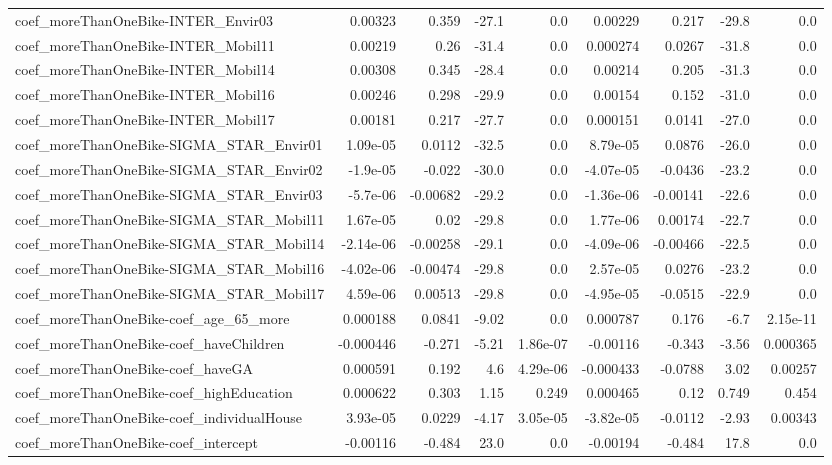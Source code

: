 \begin{tabular}{lrrrrrrrr}
coef_moreThanOneBike-INTER_Envir03 & 0.00323 & 0.359 & -27.1 & 0.0 & 0.00229 & 0.217 & -29.8 & 0.0 \\
coef_moreThanOneBike-INTER_Mobil11 & 0.00219 & 0.26 & -31.4 & 0.0 & 0.000274 & 0.0267 & -31.8 & 0.0 \\
coef_moreThanOneBike-INTER_Mobil14 & 0.00308 & 0.345 & -28.4 & 0.0 & 0.00214 & 0.205 & -31.3 & 0.0 \\
coef_moreThanOneBike-INTER_Mobil16 & 0.00246 & 0.298 & -29.9 & 0.0 & 0.00154 & 0.152 & -31.0 & 0.0 \\
coef_moreThanOneBike-INTER_Mobil17 & 0.00181 & 0.217 & -27.7 & 0.0 & 0.000151 & 0.0141 & -27.0 & 0.0 \\
coef_moreThanOneBike-SIGMA_STAR_Envir01 & 1.09e-05 & 0.0112 & -32.5 & 0.0 & 8.79e-05 & 0.0876 & -26.0 & 0.0 \\
coef_moreThanOneBike-SIGMA_STAR_Envir02 & -1.9e-05 & -0.022 & -30.0 & 0.0 & -4.07e-05 & -0.0436 & -23.2 & 0.0 \\
coef_moreThanOneBike-SIGMA_STAR_Envir03 & -5.7e-06 & -0.00682 & -29.2 & 0.0 & -1.36e-06 & -0.00141 & -22.6 & 0.0 \\
coef_moreThanOneBike-SIGMA_STAR_Mobil11 & 1.67e-05 & 0.02 & -29.8 & 0.0 & 1.77e-06 & 0.00174 & -22.7 & 0.0 \\
coef_moreThanOneBike-SIGMA_STAR_Mobil14 & -2.14e-06 & -0.00258 & -29.1 & 0.0 & -4.09e-06 & -0.00466 & -22.5 & 0.0 \\
coef_moreThanOneBike-SIGMA_STAR_Mobil16 & -4.02e-06 & -0.00474 & -29.8 & 0.0 & 2.57e-05 & 0.0276 & -23.2 & 0.0 \\
coef_moreThanOneBike-SIGMA_STAR_Mobil17 & 4.59e-06 & 0.00513 & -29.8 & 0.0 & -4.95e-05 & -0.0515 & -22.9 & 0.0 \\
coef_moreThanOneBike-coef_age_65_more & 0.000188 & 0.0841 & -9.02 & 0.0 & 0.000787 & 0.176 & -6.7 & 2.15e-11 \\
coef_moreThanOneBike-coef_haveChildren & -0.000446 & -0.271 & -5.21 & 1.86e-07 & -0.00116 & -0.343 & -3.56 & 0.000365 \\
coef_moreThanOneBike-coef_haveGA & 0.000591 & 0.192 & 4.6 & 4.29e-06 & -0.000433 & -0.0788 & 3.02 & 0.00257 \\
coef_moreThanOneBike-coef_highEducation & 0.000622 & 0.303 & 1.15 & 0.249 & 0.000465 & 0.12 & 0.749 & 0.454 \\
coef_moreThanOneBike-coef_individualHouse & 3.93e-05 & 0.0229 & -4.17 & 3.05e-05 & -3.82e-05 & -0.0112 & -2.93 & 0.00343 \\
coef_moreThanOneBike-coef_intercept & -0.00116 & -0.484 & 23.0 & 0.0 & -0.00194 & -0.484 & 17.8 & 0.0 \\

\end{tabular}
